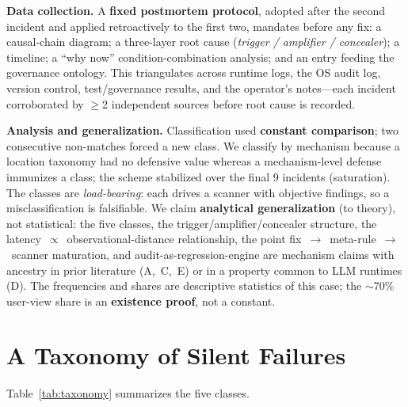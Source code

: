 \documentclass[conference]{IEEEtran}
\begin{document}
\textbf{Data collection.} A \textbf{fixed postmortem protocol}, adopted
after the second incident and applied retroactively to the first two,
mandates before any fix: a causal-chain diagram; a three-layer root cause
(\emph{trigger / amplifier / concealer}); a timeline; a ``why now''
condition-combination analysis; and an entry feeding the governance
ontology. This triangulates across runtime logs, the OS audit log, version
control, test/governance results, and the operator's notes---each incident
corroborated by $\geq$2 independent sources before root cause is recorded.

\textbf{Analysis and generalization.} Classification used \textbf{constant
comparison}; two consecutive non-matches forced a new class. We classify
by mechanism because a location taxonomy had no defensive value whereas a
mechanism-level defense immunizes a class; the scheme stabilized over the
final 9 incidents (saturation). The classes are \emph{load-bearing}: each
drives a scanner with objective findings, so a misclassification is
falsifiable. We claim \textbf{analytical generalization} (to theory), not
statistical: the five classes, the trigger/amplifier/concealer structure,
the latency~$\propto$~observational-distance relationship, the point
fix~$\to$~meta-rule~$\to$~scanner maturation, and audit-as-regression-engine
are mechanism claims with ancestry in prior literature (A,~C,~E) or in a
property common to LLM runtimes (D). The frequencies and shares are
descriptive statistics of this case; the $\sim$70\% user-view share is an
\textbf{existence proof}, not a constant.

\section{A Taxonomy of Silent Failures}\label{sec:taxonomy}
Table~\ref{tab:taxonomy} summarizes the five classes.
\end{document}
